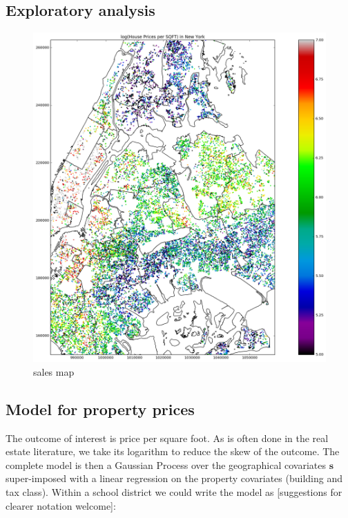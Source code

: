 \documentclass[letter]{article}
\makeatletter
\def\maxwidth{\ifdim\Gin@nat@width>\linewidth\linewidth
\else\Gin@nat@width\fi}
\let\Oldincludegraphics\includegraphics
\renewcommand{\includegraphics}[1]{\Oldincludegraphics[width=.8\maxwidth]{#1}}
\newcommand{\svec}{\mathbold{s}}
\makeatother
\begin{document}
    	\subsection{Exploratory analysis}\label{exploratory-analysis}

\begin{figure}
\centering
\includegraphics{NYC/NYC_plots/NYC_sales.png}
\caption{sales map}
\end{figure}
    


    	\subsection{Model for property prices}\label{model-for-property-prices}

The outcome of interest is price per square foot. As is often done in the real estate literature, we take its logarithm to reduce the skew of the outcome. The complete model is then a Gaussian Process over the geographical covariates \(\svec\) super-imposed with a linear regression on the property covariates (building and tax class). Within a school district we could write the model as {[}suggestions for clearer notation welcome{]}:
\end{document}
